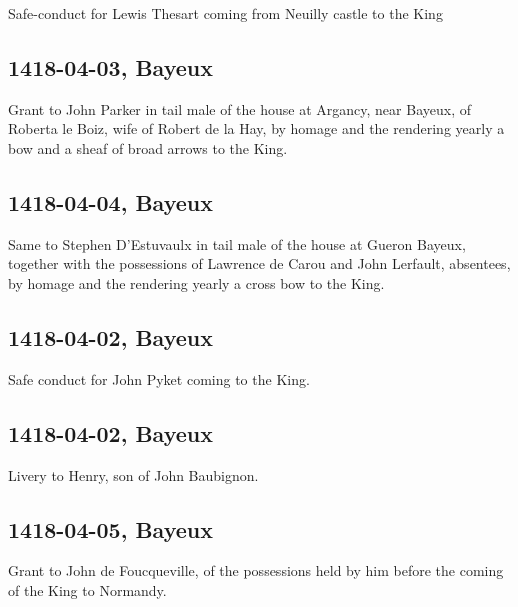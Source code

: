 \documentclass[a4paper,12pt,twoside]{book}
\begin{document}
                  Safe-conduct for Lewis Thesart coming from Neuilly castle to the King
               
            \subsection{1418-04-03, Bayeux}
            
                  Grant to John Parker in tail male of the house at Argancy, near Bayeux, of Roberta le Boiz, wife of Robert de la Hay, by homage and the rendering yearly a bow and a sheaf of broad arrows to the King.
               
            \subsection{1418-04-04, Bayeux}
            
                  Same to Stephen D’Estuvaulx in tail male of the house at Gueron Bayeux, together with the possessions of Lawrence de Carou and John Lerfault, absentees, by homage and the rendering yearly a cross bow to the King.
               
            \subsection{1418-04-02, Bayeux}
            
                  Safe conduct for John Pyket coming to the King.
               
            \subsection{1418-04-02, Bayeux}
            
                  Livery to Henry, son of John Baubignon.
               
            \subsection{1418-04-05, Bayeux}
            
                  Grant to John de Foucqueville, of the possessions held by him before the coming of the King to Normandy.
               
\end{document}
